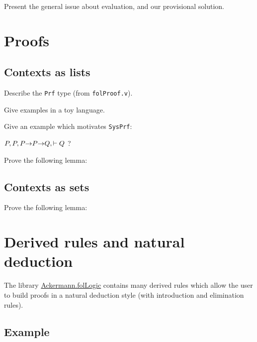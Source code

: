 \begin{todo}
  Present the general issue about evaluation, and our provisional solution.
\end{todo}






\section{Proofs}

\subsection{Contexts as lists}
\begin{todo}
Describe the \texttt{Prf} type (from \texttt{folProof.v}).

Give examples in a toy language.

Give an example which motivates \texttt{SysPrf}:

$P,P , P\mbox{$\rightarrow$} P \mbox{$\rightarrow$} Q, \vdash Q$ ?
\end{todo}

\begin{exercise}

Prove the following lemma:

\end{exercise}

\subsection{Contexts as sets}

\begin{exercise}

Prove the following lemma:

\end{exercise}


\section{Derived rules and natural deduction}


 The library 
 \href{../theories/html/hydras.Ackermann.folLogic.html}{Ackermann.folLogic} contains many derived rules which allow the user to build proofs in a natural deduction style (with introduction and elimination rules).

\subsection{Example}

